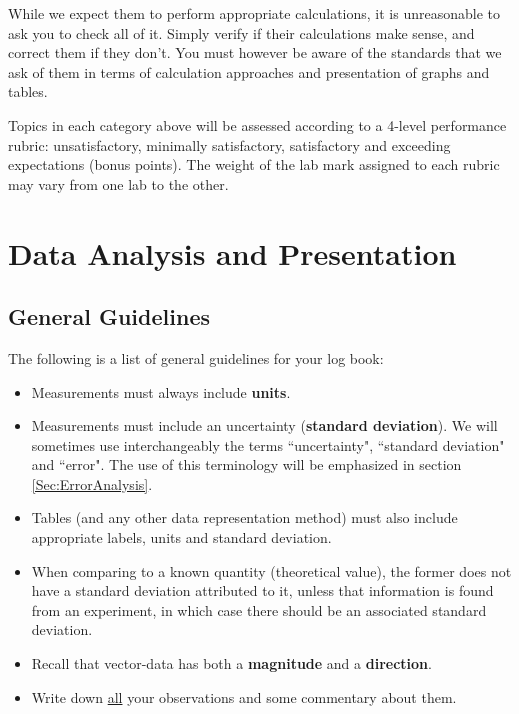 \documentclass[12pt]{report}
\def\anhkhoi#1{{\color{purple}[#1]}}
\begin{document}
\begin{itemize}
\begin{tcolorbox}
While we expect them to perform appropriate calculations, it is unreasonable to ask you to check all of it. Simply verify if their calculations make sense, and correct them if they don't. You must however be aware of the standards that we ask of them in terms of calculation approaches and presentation of graphs and tables.
\end{tcolorbox}

\end{itemize}

Topics in each category above will be assessed according to a 4-level performance rubric: unsatisfactory, minimally satisfactory, satisfactory and exceeding expectations (bonus points). The weight of the lab mark assigned to each rubric may vary from one lab to the other.


\chapter{Data Analysis and Presentation}
\label{Ch:Data-analysis}

\section{General Guidelines}
\label{Sec:General-guidelines}
The following is a list of general guidelines for your log book:
\begin{itemize}
\item Measurements must always include \textbf{units}.
\item Measurements must include an uncertainty (\textbf{standard deviation}). We will sometimes use interchangeably the terms ``uncertainty", ``standard deviation" and ``error". The use of this terminology will be emphasized in section \ref{Sec:ErrorAnalysis}.
\item Tables (and any other data representation method) must also include appropriate labels, units and standard deviation.
\item When comparing to a known quantity (theoretical value), the former does not have a standard deviation attributed to it, unless that information is found from an experiment, in which case there should be an associated standard deviation.
\item Recall that vector-data has both a \textbf{magnitude} and a \textbf{direction}.
\item Write down \underline{all} your observations and some commentary about them.
\end{itemize}
\end{document}
